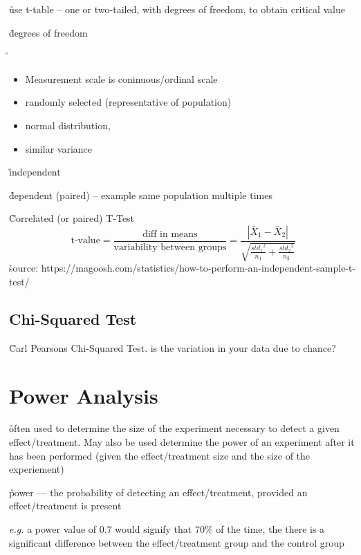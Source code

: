 \r{use t-table -- one or two-tailed, with degrees of freedom, to obtain critical value}

\r{degrees of freedom}

\r{\begin{itemize}[noitemsep,topsep=0pt]
		\item Measurement scale is coninuous/ordinal scale
		\item randomly selected (representative of population)
		\item normal distribution,
		\item similar variance
	\end{itemize}
}

\r{independent}

\r{dependent (paired) -- example same population multiple times}


\r{Correlated (or paired) T-Test}
\begin{equation}
	{\textrm{t-value} = \frac{ \textrm{diff in means}}{\textrm{variability between groups}} = \frac{ |\bar{X}_1 - \bar{X}_2|}{ 
			\sqrt{ \frac{ {std_1}^2 }{ n_1 } + \frac{ {std_2}^2 }{ n_2 }}}}
	\label{eq:paired_t_test}
\end{equation}
\r{source: https://magoosh.com/statistics/how-to-perform-an-independent-sample-t-test/}


\subsection{Chi-Squared Test}

\r{Carl Pearsons Chi-Squared Test. is the variation in your data due to chance?}


\section{Power Analysis}

\r{often used to determine the size of the experiment necessary to detect a given effect/treatment. May also be used determine the power of an experiment after it has been performed (given the effect/treatment size and the size of the experiement)}

\r{power --- the probability of detecting an effect/treatment, provided an effect/treatment is present}

\r{\textit{e.g.} a power value of $0.7$ would signify that $70\%$ of the time, the there is a significant difference between the effect/treatment group and the control group}

